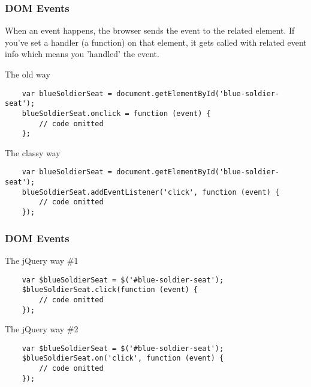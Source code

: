 \begin{frame}[fragile]
  \frametitle{DOM Events}

  When an event happens, the browser sends the event to the related element. If you've set a handler (a function) on that element, it gets called with related event info which means you 'handled' the event.

  \pause

  \begin{block}{The old way}
    {\scriptsize
    \begin{verbatim}
    var blueSoldierSeat = document.getElementById('blue-soldier-seat');
    blueSoldierSeat.onclick = function (event) {
        // code omitted
    };
    \end{verbatim}
    }
  \end{block}

  \pause

  \begin{block}{The classy way}
    {\scriptsize
    \begin{verbatim}
    var blueSoldierSeat = document.getElementById('blue-soldier-seat');
    blueSoldierSeat.addEventListener('click', function (event) {
        // code omitted
    });
    \end{verbatim}
    }
  \end{block}
\end{frame}

\begin{frame}[fragile]
  \frametitle{DOM Events}

  \begin{block}{The jQuery way \#1}
    {\scriptsize
    \begin{verbatim}
    var $blueSoldierSeat = $('#blue-soldier-seat');
    $blueSoldierSeat.click(function (event) {
        // code omitted
    });
    \end{verbatim}
    }
  \end{block}

  \pause

  \begin{block}{The jQuery way \#2}
    {\scriptsize
    \begin{verbatim}
    var $blueSoldierSeat = $('#blue-soldier-seat');
    $blueSoldierSeat.on('click', function (event) {
        // code omitted
    });
    \end{verbatim}
    }
  \end{block}
\end{frame}

